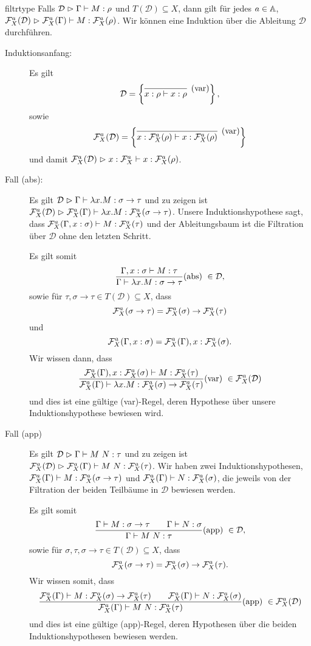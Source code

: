 \begin{lemma}{}{filtrtype}
    Falls $\mathcal{D}\judges\Gamma\vdash M : \rho$ und $T(\mathcal{D})\subseteq X$, dann gilt für jedes $a\in\At$, $\F^a_X(\mathcal{D})\judges\F^a_X(\Gamma)\vdash M : \F^a_X(\rho)$.
    \Proof
    Wir können eine Induktion über die Ableitung $\mathcal{D}$ durchführen. 
    \begin{description}
        \item[Induktionsanfang:] Es gilt \[\mathcal{D}=\left\{\infer[\text{(var)}]{x:\rho\vdash x :\rho}{}\right\},\] sowie \[\F^a_X(\mathcal{D})=\left\{\infer[\text{(var)}]{x:\F^a_X(\rho)\vdash x:\F^a_X(\rho)}{}\right\}\] und damit $\F^a_X(\mathcal{D})\judges x:\F^a_X\vdash x:\F^a_X(\rho)$.
\item[Fall (abs):] Es gilt $\mathcal{D}\judges\Gamma\vdash \lambda x.M : \sigma\to\tau$ und zu zeigen ist $\F^a_X(\mathcal{D})\judges\F^a_X(\Gamma)\vdash\lambda x.M : \F^a_X(\sigma\to\tau)$. Unsere Induktionshypothese sagt, dass $\F^a_X(\Gamma, x:\sigma)\vdash M:\F^a_X(\tau)$ und der Ableitungsbaum ist die Filtration über $\mathcal{D}$ ohne den letzten Schritt.

Es gilt somit\[\revfrac{\Gamma\vdash \lambda x.M : \sigma\to\tau}{\Gamma, x:\sigma \vdash M: \tau}\text{(abs)}~\in\mathcal{D},\] sowie für $\tau, \sigma\to\tau\in T(\mathcal{D})\subseteq X$, dass \[\F^a_X(\sigma\to\tau)=\F^a_X(\sigma)\to\F^a_X(\tau)\] und \[\F^a_X(\Gamma, x:\sigma) = \F^a_X(\Gamma), x: \F^a_X(\sigma).\] Wir wissen dann, dass 
\[\revfrac{\F^a_X(\Gamma)\vdash\lambda x.M:\F^a_X(\sigma)\to \F^a_X(\tau)}{\F^a_X(\Gamma), x:\F^a_X(\sigma)\vdash M :\F^a_X(\tau)}\text{(var)}~\in\F^a_X(\mathcal{D})\] und dies ist eine gültige (var)-Regel, deren Hypothese über unsere Induktionshypothese bewiesen wird.
\item[Fall (app)] Es gilt $\mathcal{D}\judges\Gamma\vdash M~N:\tau$ und zu zeigen ist $\F^a_X(\mathcal{D})\judges\F^a_X(\Gamma)\vdash M~N:\F^a_X(\tau)$. Wir haben zwei Induktionshypothesen, $\F^a_X(\Gamma)\vdash M:\F^a_X(\sigma\to\tau)$ und $\F^a_X(\Gamma)\vdash N:\F^a_X(\sigma)$, die jeweils von der Filtration der beiden Teilbäume in $\mathcal{D}$ bewiesen werden.

Es gilt somit
\[\revfrac{\Gamma\vdash M~N:\tau}{\Gamma\vdash M:\sigma\to\tau \qquad \Gamma\vdash N:\sigma}\text{(app)}~\in\mathcal{D},\] sowie für $\sigma, \tau,\sigma\to\tau\in T(\mathcal{D})\subseteq X$, dass \[\F^a_X(\sigma\to\tau) = \F^a_X(\sigma)\to\F^a_X(\tau).\] Wir wissen somit, dass
\[\revfrac{\F^a_X(\Gamma)\vdash M~N:\F^a_X(\tau)}{\F^a_X(\Gamma)\vdash M:\F^a_X(\sigma)\to\F^a_X(\tau) \qquad \F^a_X(\Gamma)\vdash N:\F^a_X(\sigma)}\text{(app)}~\in\F^a_X(\mathcal{D})\] und dies ist eine gültige (app)-Regel, deren Hypothesen über die beiden Induktionshypothesen bewiesen werden.
    \end{description}
\end{lemma}
